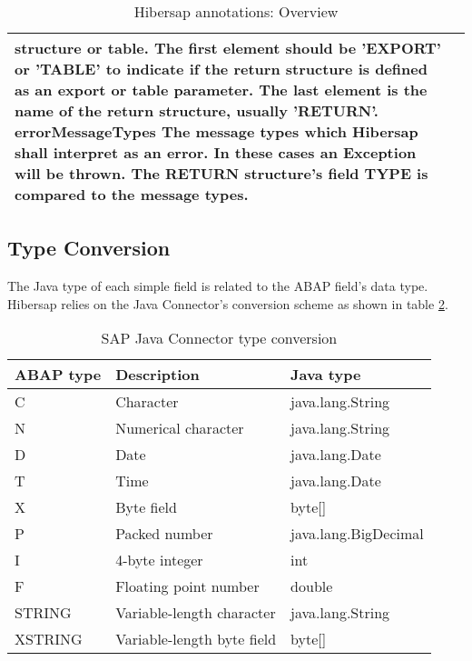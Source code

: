 \begin{table}[H]
\begin{tabularx}{\textwidth}{ l X }
                              structure or table. The first element should be 'EXPORT' or 
                              'TABLE' to indicate if the return structure is defined as an
                              export or table parameter. The last element is the name of the 
                              return structure, usually 'RETURN'. 
                              \textbf{errorMessageTypes} The message types which Hibersap 
                              shall interpret as an error. In these cases an Exception
                              will be thrown. The RETURN structure's field TYPE is 
                              compared to the message types.
    \\
    \bottomrule
  \end{tabularx}
  \caption{Hibersap annotations: Overview}
  \label{tab:Annotations}
\end{table}

\subsection{Type Conversion}

The Java type of each simple field is related to the ABAP field's data type.
Hibersap relies on the Java Connector's conversion scheme as shown in table \ref{tab:JCoConversion}.

\begin{table}[H]
  \centering
  \begin{tabular}{lll} \toprule
    \textbf{ABAP type} & \textbf{Description}       & \textbf{Java type} \\ \midrule
    C                  & Character                  & java.lang.String \\
    N                  & Numerical character        & java.lang.String \\
    D                  & Date                       & java.lang.Date \\
    T                  & Time                       & java.lang.Date \\
    X                  & Byte field                 & byte[] \\
    P                  & Packed number              & java.lang.BigDecimal \\
    I                  & 4-byte integer             & int \\
    F                  & Floating point number      & double \\
    STRING             & Variable-length character  & java.lang.String \\
    XSTRING            & Variable-length byte field & byte[] \\ \bottomrule
  \end{tabular}
  \caption{SAP Java Connector type conversion}
  \label{tab:JCoConversion}
\end{table}

